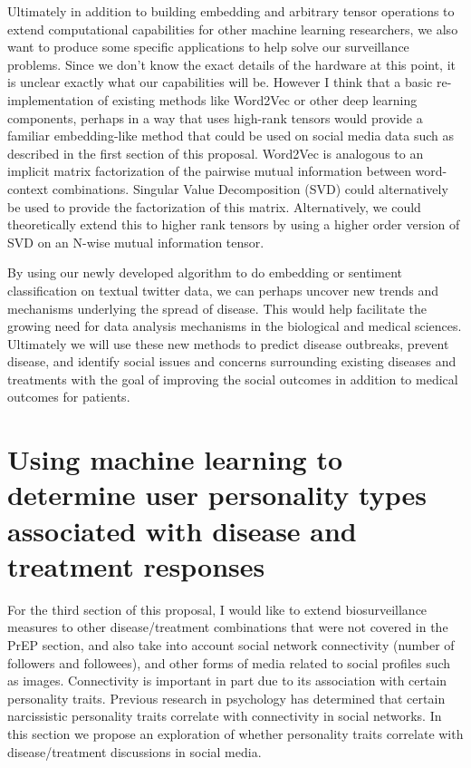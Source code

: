 Ultimately in addition to building embedding and arbitrary tensor operations to extend computational capabilities for other machine learning researchers, we also want to produce some specific applications to help solve our surveillance problems. Since we don't know the exact details of the hardware at this point, it is unclear exactly what our capabilities will be. However I think that a basic re-implementation of existing methods like Word2Vec or other deep learning components, perhaps in a way that uses high-rank tensors would provide a familiar embedding-like method that could be used on social media data such as described in the first section of this proposal. Word2Vec is analogous to an implicit matrix factorization of the pairwise mutual information between word-context combinations\cite{levy2014neural}. Singular Value Decomposition (SVD) could alternatively be used to provide the factorization of this matrix. Alternatively, we could theoretically extend this to higher rank tensors by using a higher order version of SVD on an N-wise mutual information tensor.

By using our newly developed algorithm to do embedding or sentiment classification on textual twitter data, we can perhaps uncover new trends and mechanisms underlying the spread of disease. This would help facilitate the growing need for data analysis mechanisms in the biological and medical sciences\cite{cichocki2014era}. Ultimately we will use these new methods to predict disease outbreaks, prevent disease, and identify social issues and concerns surrounding existing diseases and treatments with the goal of improving the social outcomes in addition to medical outcomes for patients.

\section{Using machine learning to determine user personality types associated with disease and treatment responses}

For the third section of this proposal, I would like to extend biosurveillance measures to other disease/treatment combinations that were not covered in the PrEP section, and also take into account social network connectivity (number of followers and followees), and other forms of media related to social profiles such as images. Connectivity is important in part due to its association with certain personality traits. Previous research in psychology has determined that certain narcissistic personality traits correlate with connectivity in social networks\cite{buffardi2008narcissism}. In this section we propose an exploration of whether personality traits correlate with disease/treatment discussions in social media.

